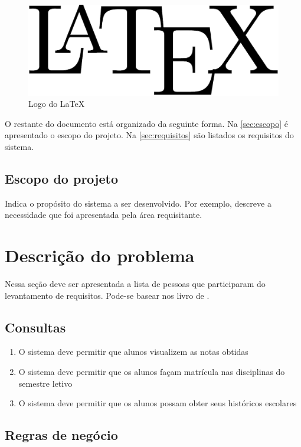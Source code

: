 \documentclass[11pt]{../../classes/ifscarticle}
\begin{document}
\begin{figure}[ht]
    \centering
    \includegraphics[width=.5\linewidth]{figuras/latex-logo}
    \caption{Logo do \LaTeX}
    \label{fig:logolatex}
\end{figure}

O restante do documento está organizado da seguinte forma. Na \autoref{sec:escopo} é apresentado o escopo do projeto. Na \autoref{sec:requisitos} são listados os requisitos do sistema.

\subsection{Escopo do projeto}
\label{sec:escopo}

Indica o propósito do sistema a ser desenvolvido. Por exemplo, descreve a necessidade que foi apresentada pela área requisitante. \lipsum[2]


\section{Descrição do problema}


Nessa seção deve ser apresentada a lista de pessoas que participaram do levantamento de requisitos. Pode-se basear nos livro de \cite{bezerra02}.

\lipsum[2]


\subsection{Consultas}

\begin{enumerate}
    \item O sistema deve permitir que alunos visualizem as notas obtidas
    \item O sistema deve permitir que os alunos façam matrícula nas disciplinas do semestre letivo
    \item O sistema deve permitir que os alunos possam obter seus históricos escolares
\end{enumerate}

\subsection{Regras de negócio}
\label{sec:regrasdenegocio}
\end{document}
